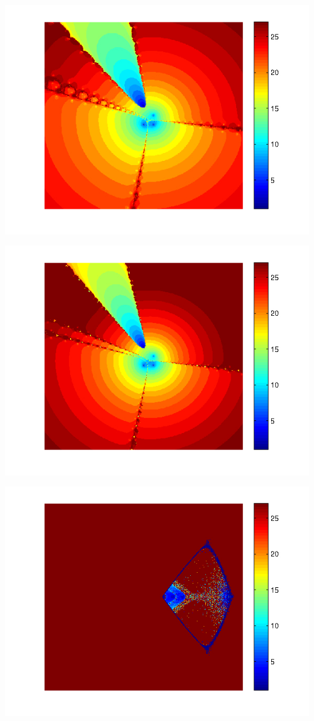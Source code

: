 \documentclass{article}
\begin{document}
\includegraphics[scale=0.95]{example2halleyHigh.jpg}

\includegraphics[scale=0.95]{example2jarrattHigh.jpg}

\includegraphics[scale=0.95]{example3halleyHigh.jpg}
\end{document}

